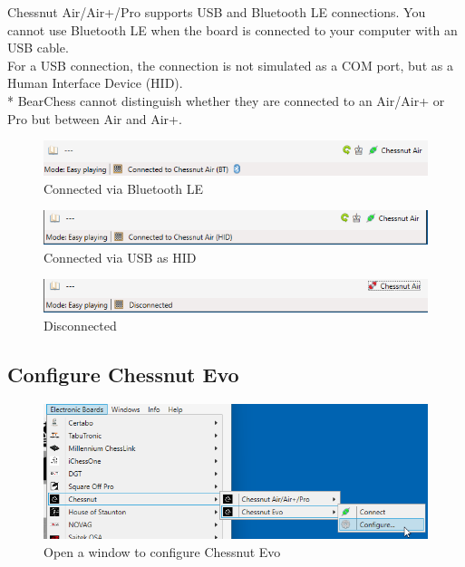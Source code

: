 \documentclass[11pt,a4paper]{article}
\begin{document}
Chessnut Air/Air+/Pro supports USB and Bluetooth LE connections. You cannot use Bluetooth LE when the board is connected to your computer with an USB cable.\\
For a USB connection, the connection is not simulated as a COM port, but as a Human Interface Device (HID).\\
{\color{red}*} BearChess cannot distinguish whether they are connected to an Air/Air+ or Pro but between Air and Air+.

\begin{figure}[H]
	\centering
	\includegraphics[scale=0.7]{ChessnutAir2.png}
	\caption{Connected via Bluetooth LE}
	\label{fig:ChessnutAir2}
\end{figure}


\begin{figure}[H]
	\centering
	\includegraphics[scale=0.7]{ChessnutAir4.png}
	\caption{Connected via USB as HID}
	\label{fig:ChessnutAir4}
\end{figure}



\begin{figure}[H]
	\centering
	\includegraphics[scale=0.7]{ChessnutAir3.png}
	\caption{Disconnected}
	\label{fig:ChessnutAir3}
\end{figure}


\subsection{Configure Chessnut Evo} \label{ConfigureChessnutEvo}
\begin{figure}[H]
	\centering
	\includegraphics[scale=0.7]{ChessnutEvo5.png}
	\caption{Open a window to configure Chessnut Evo}
	\label{fig:ChessnutEvo5}
\end{figure}
\end{document}
